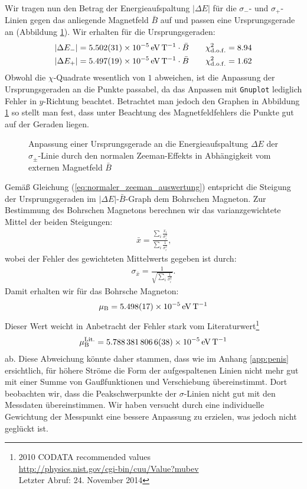 \documentclass[11pt, a4paper]{article}
\begin{document}
Wir tragen nun den Betrag der Energieaufspaltung $|\Delta E|$ für die $\sigma_-$- und $\sigma_+$-Linien gegen das anliegende Magnetfeld $\bar{B}$ auf und passen eine Ursprungsgerade an (Abbildung \ref{fig:magneton_fit}).
Wir erhalten für die Ursprungsgeraden:
\begin{align*}
	|\Delta E_{-}| = \SI{5.502 +- 0.031e-5}{\electronvolt\per\tesla} \cdot \bar{B} \qquad \chi_\mathrm{d.o.f.}^2 = 8.94\\
	|\Delta E_{+}| = \SI{5.497 +- 0.019e-5}{\electronvolt\per\tesla} \cdot \bar{B} \qquad \chi_\mathrm{d.o.f.}^2 = 1.62
\end{align*}
Obwohl die $\chi$-Quadrate wesentlich von $1$ abweichen, ist die Anpassung der Ursprungsgeraden an die Punkte passabel, da das Anpassen mit \texttt{Gnuplot} lediglich Fehler in $y$-Richtung beachtet.
Betrachtet man jedoch den Graphen in Abbildung \ref{fig:magneton_fit} so stellt man fest, dass unter Beachtung des Magnetfeldfehlers die Punkte gut auf der Geraden liegen.
\begin{figure}[h]
	\centering
	
	\caption{Anpassung einer Ursprungsgerade an die Energieaufspaltung $\Delta E$ der $\sigma_\pm$-Linie durch den normalen Zeeman-Effekts in Abhängigkeit vom externen Magnetfeld $\bar{B}$}
	\label{fig:magneton_fit}
\end{figure}
Gemäß Gleichung (\ref{eq:normaler_zeeman_auswertung}) entspricht die Steigung der Ursprungsgeraden im $|\Delta E|$-$\bar{B}$-Graph dem Bohrschen Magneton. Zur Bestimmung des Bohrschen Magnetons berechnen wir das varianzgewichtete Mittel der beiden Steigungen:
\begin{align*}
	\bar{x} = \frac{\sum_i \frac{x_i}{\sigma_i^2}}{\sum_i \frac{1}{\sigma_i^2}}\text{,}
\end{align*}
wobei der Fehler des gewichteten Mittelwerts gegeben ist durch:
\begin{align*}
	\sigma_{\bar{x}} = \frac{1}{\sqrt{\sum_i \frac{1}{\sigma_i^2}}}\text{.}
\end{align*}
Damit erhalten wir für das Bohrsche Magneton:
\begin{align*}
	\mu_\mathrm{B} = \SI{5.498 +- 0.017e-5}{\electronvolt\per\tesla}
\end{align*}
Dieser Wert weicht in Anbetracht der Fehler stark vom Literaturwert\footnote{2010 CODATA recommended values\\ \url{http://physics.nist.gov/cgi-bin/cuu/Value?mubev}\\ Letzter Abruf: 24. November 2014}
\begin{align*}
	\mu_\mathrm{B}^{\mathrm{Lit.}} = \SI{5.7883818066 +- 0.0000000038e-5}{\electronvolt\per\tesla}
\end{align*}
ab.
Diese Abweichung könnte daher stammen, dass wie im Anhang \ref{app:penis} ersichtlich, für höhere Ströme die Form der aufgespaltenen Linien nicht mehr gut mit einer Summe von Gaußfunktionen und Verschiebung übereinstimmt.
Dort beobachten wir, dass die Peakschwerpunkte der $\sigma$-Linien nicht gut mit den Messdaten übereinstimmen.
Wir haben versucht durch eine individuelle Gewichtung der Messpunkt eine bessere Anpassung zu erzielen, was jedoch nicht geglückt ist.
\end{document}
